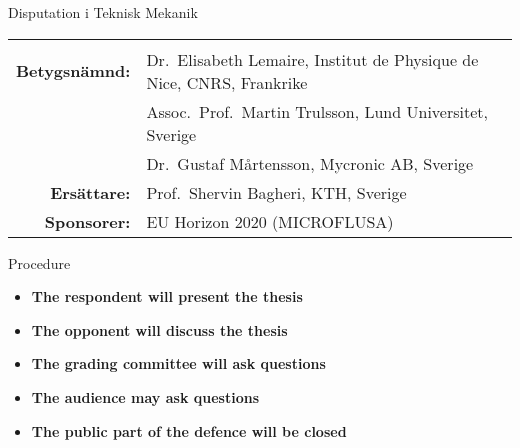 \begin{frame}[plain]{Disputation i Teknisk Mekanik}
\begin{longtable}[]{@{}rl@{}}
\begin{minipage}[t]{0.72\columnwidth}
  \end{minipage}\tabularnewline
  \begin{minipage}[t]{0.22\columnwidth}\raggedleft
    \textbf{Betygsnämnd:}\strut
  \end{minipage} & \begin{minipage}[t]{0.72\columnwidth}\raggedright
    Dr.~Elisabeth Lemaire, Institut de Physique de Nice, CNRS, Frankrike\strut
  \end{minipage}\tabularnewline
  \begin{minipage}[t]{0.22\columnwidth}\raggedleft
    \strut
  \end{minipage} & \begin{minipage}[t]{0.72\columnwidth}\raggedright
    Assoc.~Prof.~Martin Trulsson, Lund Universitet, Sverige\strut
  \end{minipage}\tabularnewline
  \begin{minipage}[t]{0.22\columnwidth}\raggedleft
    \strut
  \end{minipage} & \begin{minipage}[t]{0.72\columnwidth}\raggedright
    Dr.~Gustaf M\aa rtensson, Mycronic AB, Sverige\strut
  \end{minipage}\tabularnewline
  \begin{minipage}[t]{0.22\columnwidth}\raggedleft
    \textbf{Ersättare:}\strut
  \end{minipage} & \begin{minipage}[t]{0.72\columnwidth}\raggedright
    Prof.~Shervin Bagheri, KTH, Sverige\strut
  \end{minipage}\tabularnewline
  \begin{minipage}[t]{0.22\columnwidth}\raggedleft
    \textbf{Sponsorer:}\strut
  \end{minipage} & \begin{minipage}[t]{0.72\columnwidth}\raggedright
    EU Horizon 2020 (MICROFLUSA)\strut
  \end{minipage}\tabularnewline
  \bottomrule
\end{longtable}
\end{frame}

\begin{frame}[plain]{Procedure}
\protect\hypertarget{procedure}{}
\begin{itemize}
\item
  \textbf{The respondent will present the thesis}
  \medskip
\item
  \textbf{The opponent will discuss the thesis}
  \medskip
\item
  \textbf{The grading committee will ask questions}
  \medskip
\item
  \textbf{The audience may ask questions}
  \medskip
\item
  \textbf{The public part of the defence will be closed}
  \medskip
\end{itemize}
\end{frame}
